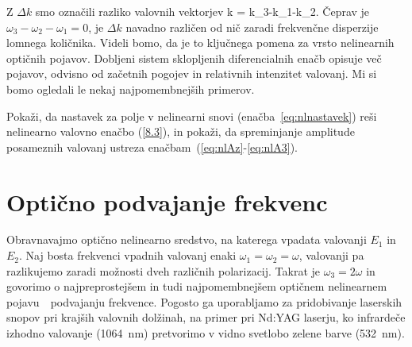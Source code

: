 Z $\Delta k$ smo označili razliko valovnih vektorjev
\beq
\Delta k = k_{3}-k_{1}-k_{2}.
\eeq
Čeprav je $\omega_{3}-\omega_{2}-\omega_{1}=0$, je $\Delta k$ navadno različen od nič zaradi 
frekvenčne disperzije lomnega količnika. Videli bomo, da je to ključnega pomena 
za vrsto nelinearnih optičnih pojavov. Dobljeni sistem sklopljenih diferencialnih enačb opisuje več pojavov, 
odvisno od začetnih pogojev in relativnih intenzitet valovanj. Mi si bomo ogledali le nekaj
najpomembnejših primerov.
\begin{definition}
Pokaži, da nastavek za polje v nelinearni snovi (enačba~\ref{eq:nlnastavek}) reši nelinearno
valovno enačbo (\ref{8.3}), in pokaži, da spreminjanje amplitude posameznih valovanj 
ustreza enačbam~(\ref{eq:nlAz}-\ref{eq:nlA3}).
\end{definition}

\section{Optično podvajanje frekvenc}

Obravnavajmo optično nelinearno sredstvo, na katerega vpadata valovanji $E_1$ in $E_2$.
Naj bosta frekvenci vpadnih valovanj enaki $\omega_{1}=\omega_{2}=\omega$, valovanji
pa razlikujemo zaradi možnosti dveh različnih polarizacij. Takrat je $\omega_{3}=2\omega$
in govorimo o najpreprostejšem in tudi najpomembnejšem optičnem nelinearnem 
pojavu~\textendash~podvajanju 
frekvence. 
Pogosto ga uporabljamo za pridobivanje laserskih snopov pri krajših valovnih dolžinah, na primer
pri Nd:YAG laserju, ko infrardeče izhodno valovanje (1064~nm) 
pretvorimo v vidno svetlobo zelene barve (532~nm). 

